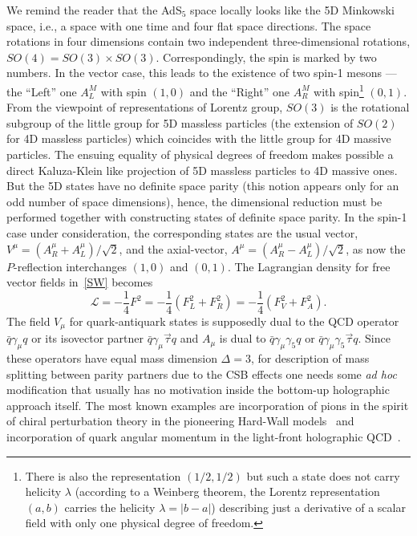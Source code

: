 \documentclass[a4paper,11pt]{article}
\begin{document}
We remind the reader that the AdS$_5$ space locally looks like the 5D Minkowski space, i.e.,
a space with one time and four flat space directions. The space rotations in four dimensions
contain two independent three-dimensional rotations, $SO(4)=SO(3)\times SO(3)$. Correspondingly,
the spin is marked by two numbers. In the vector case, this leads to the existence of two spin-1
mesons --- the ``Left'' one $A^M_L$ with spin $(1,0)$ and the ``Right'' one $A^M_R$ with
spin\footnote{There is also the representation $(1/2,1/2)$ but such a state does not carry helicity $\lambda$
(according to a Weinberg theorem, the Lorentz representation $(a,b)$ carries the helicity $\lambda=|b-a|$)
describing just a derivative of a scalar field with only one physical degree of freedom.} $(0,1)$.
From the viewpoint of representations of Lorentz group,
$SO(3)$ is the rotational subgroup of the little group for 5D massless particles (the extension of $SO(2)$
for 4D massless particles) which coincides with the little group for 4D massive particles. The ensuing equality
of physical degrees of freedom makes possible a direct Kaluza-Klein like projection of 5D massless particles
to 4D massive ones. But the 5D states have no definite space parity (this notion appears only for an odd number of
space dimensions), hence, the dimensional reduction must be performed together with constructing states of definite
space parity. In the spin-1 case under consideration, the corresponding states are the usual vector,
$V^\mu=(A^\mu_R+A^\mu_L)/\sqrt{2}$, and the axial-vector, $A^\mu=(A^\mu_R-A^\mu_L)/\sqrt{2}$, as now the
$P$-reflection interchanges $(1,0)$ and $(0,1)$. The Lagrangian density for free vector fields in~\eqref{SW}
becomes
\begin{equation}
\mathcal{L}=-\frac14F^2=-\frac14\left(F^2_L+F^2_R\right)=-\frac14\left(F^2_V+F^2_A\right).
\end{equation}
The field $V_\mu$ for quark-antiquark states is supposedly dual to the QCD operator $\bar{q}\gamma_\mu q$
or its isovector partner $\bar{q}\gamma_\mu\vec{\tau} q$ and $A_\mu$ is dual to $\bar{q}\gamma_\mu\gamma_5 q$
or $\bar{q}\gamma_\mu\gamma_5\vec{\tau} q$.
Since these operators have equal mass dimension $\Delta=3$, for description of mass splitting between parity
partners due to the CSB effects one needs some {\it ad hoc} modification that usually has no motivation inside
the bottom-up holographic approach itself. The most known examples are incorporation of pions in the spirit of chiral
perturbation theory in the pioneering Hard-Wall models~\cite{son1,pom} and incorporation of quark angular momentum
in the light-front holographic QCD~\cite{br3}.
\end{document}
